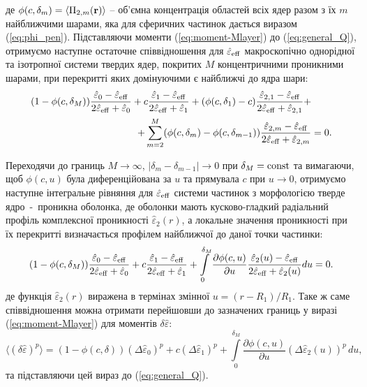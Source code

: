 \documentclass[14pt,twoside]{vakthesis}
\begin{document}
де $\phi(c,\delta_m) = \langle \Pi_{2,m} ({\bf r}) \rangle$ -- об'ємна концентрація областей всіх ядер разом з їх $m$ найближчими шарами, яка для сферичних частинок дається виразом (\ref{eq:phi_pen}). 
Підставляючи моменти (\ref{eq:moment-Mlayer}) до (\ref{eq:general_Q}), отримуємо наступне остаточне співвідношення для $\hat{\varepsilon}_{\rm eff}$ макроскопічно однорідної та ізотропної системи твердих ядер, покритих  $M$ концентричними проникними шарами, при перекритті яких домінуючими є найближчі до ядра шари:
\begin{equation}\label{eq:general_Mlayer_complex}
\begin{split}
(1 - \phi(c,\delta_M)) \frac{\hat{\varepsilon}_0 - \hat{\varepsilon}_{\rm eff}}{2\hat{\varepsilon}_{\rm eff} + \hat{\varepsilon}_0}
+ c \frac{\hat{\varepsilon}_1 - \hat{\varepsilon}_{\rm eff}}{2\hat{\varepsilon}_{\rm eff} + \hat{\varepsilon}_1} + (\phi(c,\delta_1)-c) \frac{\hat{\varepsilon}_{2,1} - \hat{\varepsilon}_{\rm eff}}{2\hat{\varepsilon}_{\rm eff} + \hat{\varepsilon}_{2,1}} +& \\
+ \sum\limits_{m=2}^{M} (\phi(c,\delta_m)-\phi(c,\delta_{m-1})) \frac{\hat{\varepsilon}_{2,m} - \hat{\varepsilon}_{\rm eff}}{2\hat{\varepsilon}_{\rm eff} + \hat{\varepsilon}_{2,m}} &= 0.
\end{split}
\end{equation}

Переходячи до границь $M \to \infty$, $|\delta_{m} - \delta_{m-1}| \to 0$ при $\delta_M = {\rm const}$ та вимагаючи, щоб $\phi (c, u)$ була диференційована за $u$ та прямувала $c$ при $u\to 0$, отримуємо наступне інтегральне рівняння для $\hat{\varepsilon}_{\rm eff}$ системи частинок з морфологією тверде ядро~-~проникна оболонка, де оболонки мають кусково-гладкий радіальний профіль комплексної проникності $\hat{\varepsilon}_{2} (r)$, а локальне значення проникності при їх перекритті визначається профілем найближчої до даної точки частинки:
\begin{equation}\label{eq:general_Contlayer_complex}
(1 - \phi(c,\delta_M)) \frac{\hat{\varepsilon}_0 - \hat{\varepsilon}_{\rm eff}}{2\hat{\varepsilon}_{\rm eff} + \hat{\varepsilon}_0}
+ c \frac{\hat{\varepsilon}_1 - \hat{\varepsilon}_{\rm eff}}{2\hat{\varepsilon}_{\rm eff} + \hat{\varepsilon}_1}
+ \int\limits_0^{\delta_M} \frac{\partial \phi(c,u)}{\partial u} \frac{\hat{\varepsilon}_2 (u) - \hat{\varepsilon}_{\rm eff}}{2\hat{\varepsilon}_{\rm eff} + \hat{\varepsilon}_2 (u)} du = 0.
\end{equation}
де функція $\hat{\varepsilon}_2 (r)$ виражена в термінах змінної $u = (r - R_1)/R_1$.
Таке ж саме співвідношення можна отримати перейшовши до зазначених границь у виразі (\ref{eq:moment-Mlayer}) для моментів $\delta\hat{\varepsilon}$:
\begin{equation}\label{eq:moment-integral}
\langle (\delta\hat{\varepsilon})^p \rangle = 
(1 - \phi(c,\delta)) (\Delta\hat{\varepsilon}_0)^p + 
c (\Delta\hat{\varepsilon}_1)^p + 
\int\limits_{0}^{\delta_M} \frac{\partial \phi(c,u)}{\partial u} (\Delta\hat{\varepsilon}_2 (u))^p \, du,
\end{equation}
та підставляючи цей вираз до (\ref{eq:general_Q}).
\end{document}
